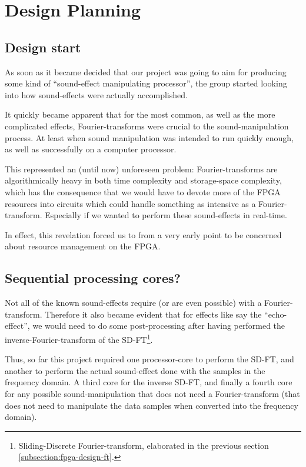 \FloatBarrier
\section{Design Planning}\label{section:fpga-design}
\subsection{Design start}

As soon as it became decided that our project was going to aim for producing
some kind of ``sound-effect manipulating processor'', the group started looking
into how sound-effects were actually accomplished.

It quickly became apparent that for the most common, as well as the more
complicated effects, Fourier-transforms were crucial to the sound-manipulation
process. At least when sound manipulation was intended to run quickly enough,
as well as successfully on a computer processor.

This represented an (until now) unforeseen problem: Fourier-transforms are
algorithmically heavy in both time complexity and storage-space complexity,
which has the consequence that we would have to devote more of the FPGA
resources into circuits which could handle something as intensive as a
Fourier-transform. Especially if we wanted to perform these sound-effects in
real-time.

In effect, this revelation forced us to from a very early point to be
concerned about resource management on the FPGA.

\subsection{Sequential processing cores?}

Not all of the known sound-effects require (or are even possible) with a
Fourier-transform. Therefore it also became evident that for effects like say
the ``echo-effect'', we would need to do some post-processing after having
performed the inverse-Fourier-transform of the SD-FT\footnote{Sliding-Discrete
Fourier-transform, elaborated in the previous section
\ref{subsection:fpga-design-ft}.}.

Thus, so far this project required one processor-core to perform the SD-FT, and
another to perform the actual sound-effect done with the samples in the
frequency domain. A third core for the inverse SD-FT, and finally a fourth core
for any possible sound-manipulation that does not need a Fourier-transform (that
does not need to manipulate the data samples when converted into the frequency
domain).

